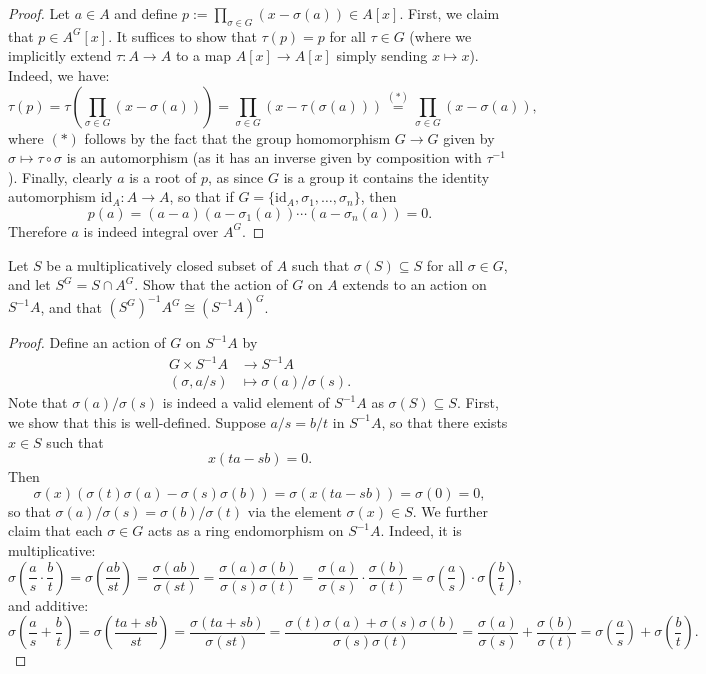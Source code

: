 \documentclass[10pt]{article}
\newcommand{\sseq}{\subseteq}
\newcommand{\id}{\mathrm{id}}
\newcommand{\1}{\mbf 1}
\newcommand{\2}{\mbf 2}
\newcommand{\3}{\mbf 3}
\newcommand{\4}{\mbf 4}
\newcommand{\5}{\mbf 5}
\newcommand{\6}{\mbf 6}
\newcommand{\7}{\mbf 7}
\newcommand{\8}{\mbf 8}
\newcommand{\9}{\mbf 9}
\newcommand{\0}{\mbf 0}
\renewcommand{\(}{\left(}
\renewcommand{\)}{\right)}
\begin{document}
\begin{enumerate}[label=(\arabic*)]
\begin{proof}
        Let $a\in A$ and define $p:=\prod_{\sigma\in G}(x-\sigma(a))\in A[x]$. First, we claim that $p\in A^G[x]$. It suffices to show that $\tau(p)=p$ for all $\tau\in G$ (where we implicitly extend $\tau:A\to A$ to a map $A[x]\to A[x]$ simply sending $x\mapsto x$). Indeed, we have:
        \[\tau(p)=\tau\(\prod_{\sigma\in G}(x-\sigma(a))\)=\prod_{\sigma\in G}(x-\tau(\sigma(a)))\overset{(\ast)}=\prod_{\sigma\in G}(x-\sigma(a)),\]
        where $(\ast)$ follows by the fact that the group homomorphism $G\to G$ given by $\sigma\mapsto \tau\circ\sigma$ is an automorphism (as it has an inverse given by composition with $\tau^{-1}$). Finally, clearly $a$ is a root of $p$, as since $G$ is a group it contains the identity automorphism $\id_A:A\to A$, so that if $G=\{\id_A,\sigma_1,\ldots,\sigma_n\}$, then
        \[p(a)=(a-a)(a-\sigma_1(a))\cdots(a-\sigma_n(a))=0.\]
        Therefore $a$ is indeed integral over $A^G$.
    \end{proof}
    Let $S$ be a multiplicatively closed subset of $A$ such that $\sigma(S)\sseq S$ for all $\sigma\in G$, and let $S^G=S\cap A^G$. Show that the action of $G$ on $A$ extends to an action on $S^{-1}A$, and that $(S^G)^{-1}A^G\cong (S^{-1}A)^G$.
    \begin{proof}
        Define an action of $G$ on $S^{-1}A$ by
        \begin{align*}
            G\times S^{-1}A&\to S^{-1}A \\
            (\sigma,a/s)&\mapsto \sigma(a)/\sigma(s).
        \end{align*}
        Note that $\sigma(a)/\sigma(s)$ is indeed a valid element of $S^{-1}A$ as $\sigma(S)\sseq S$.
        First, we show that this is well-defined. Suppose $a/s=b/t$ in $S^{-1}A$, so that there exists $x\in S$ such that
        \[x(ta-sb)=0.\]
        Then
        \[\sigma(x)(\sigma(t)\sigma(a)-\sigma(s)\sigma(b))=\sigma(x(ta-sb))=\sigma(0)=0,\]
        so that $\sigma(a)/\sigma(s)=\sigma(b)/\sigma(t)$ via the element $\sigma(x)\in S$. We further claim that each $\sigma\in G$ acts as a ring endomorphism on $S^{-1}A$. Indeed, it is multiplicative:
        \[\sigma\(\frac as\cdot\frac bt\)=\sigma\(\frac{ab}{st}\)=\frac{\sigma(ab)}{\sigma(st)}=\frac{\sigma(a)\sigma(b)}{\sigma(s)\sigma(t)}=\frac{\sigma(a)}{\sigma(s)}\cdot\frac{\sigma(b)}{\sigma(t)}=\sigma\(\frac as\)\cdot\sigma\(\frac bt\),\]
        and additive:
        \[\sigma\(\frac as+\frac bt\)=\sigma\(\frac{ta+sb}{st}\)=\frac{\sigma(ta+sb)}{\sigma(st)}=\frac{\sigma(t)\sigma(a)+\sigma(s)\sigma(b)}{\sigma(s)\sigma(t)}=\frac{\sigma(a)}{\sigma(s)}+\frac{\sigma(b)}{\sigma(t)}=\sigma\(\frac as\)+\sigma\(\frac bt\).\]
        

\end{proof}
\end{enumerate}
\end{document}
